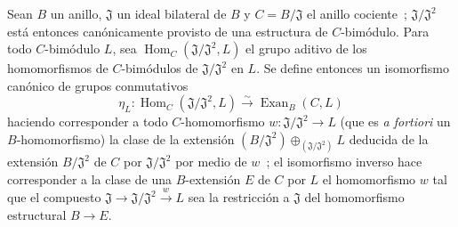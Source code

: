 \begin{proposition}[18.3.8]
\label{0.18.3.8-fr}
Sean $B$ un anillo, $\mathfrak J$ un ideal bilateral de $B$ y
$C=B/\mathfrak J$ el anillo cociente~; $\mathfrak J/\mathfrak J^2$ está entonces
canónicamente provisto de una estructura de $C$-bimódulo. Para todo $C$-bimódulo
$L$, sea $\operatorname{Hom}_C(\mathfrak J/\mathfrak J^2,L)$ el grupo
aditivo de los homomorfismos de $C$-bimódulos de $\mathfrak J/\mathfrak J^2$
en $L$. Se define entonces un \textup{isomorfismo} canónico de grupos conmutativos
\begin{equation}
\label{0.18.3.8.1-fr}
\tag{18.3.8.1}
  \eta_L:\operatorname{Hom}_C(\mathfrak J/\mathfrak J^2,L)
  \xrightarrow{\sim}\operatorname{Exan}_B(C,L)
\end{equation}
haciendo corresponder a todo $C$-homomorfismo
$w:\mathfrak J/\mathfrak J^2\to L$ \textup{(que es \emph{a fortiori} un
$B$-homomorfismo)} la clase de la extensión
$(B/\mathfrak J^2)\oplus_{(\mathfrak J/\mathfrak J^2)}L$ deducida de
la extensión $B/\mathfrak J^2$ de $C$ por $\mathfrak J/\mathfrak J^2$ por medio
de $w$~; el isomorfismo inverso hace corresponder a la clase de una
$B$-extensión $E$ de $C$ por $L$ el homomorfismo $w$ tal que el compuesto
$\mathfrak J\to\mathfrak J/\mathfrak J^2\xrightarrow{w}L$ sea la restricción
a $\mathfrak J$ del homomorfismo estructural $B\to E$.
\end{proposition}

